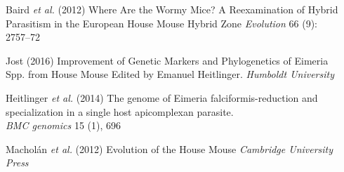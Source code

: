 \documentclass[30pt, a0paper, portrait, margin=0mm, innermargin=15mm,
               blockverticalspace=15mm, colspace=15mm, subcolspace=8mm]{tikzposter}
\begin{document}
\begin{columns}
{\begin{center}
  \end{center}
}


      {
        \begin{small}
          
          \hangindent=2cm Baird \textit{et al.} (2012) Where Are the Wormy Mice? A Reexamination of Hybrid Parasitism in the European House Mouse Hybrid Zone
           \textit{Evolution} 66 (9): 2757--72

          \hangindent=2cm Jost (2016) Improvement of Genetic Markers and Phylogenetics of Eimeria Spp. from House Mouse
          Edited by Emanuel Heitlinger. \textit{Humboldt University}

          \hangindent=2cm Heitlinger \textit{et al.} (2014) The genome of Eimeria falciformis-reduction and specialization in a single host apicomplexan         parasite.\\ \textit{BMC genomics} 15 (1), 696
                    
          \hangindent=2cm Machol\'{a}n \textit{et al.} (2012) Evolution of the House Mouse
          \textit{Cambridge University Press}
          
        
          
        \end{small}
      }

\end{columns}

\end{document}
